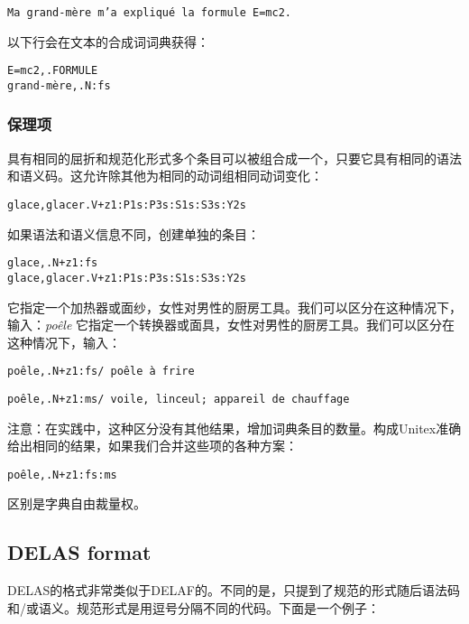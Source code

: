 \verb$Ma grand-mère m’a expliqué la formule E=mc2.$


\bigskip \noindent 以下行会在文本的合成词词典获得：


\begin{verbatim}
E=mc2,.FORMULE
grand-mère,.N:fs
\end{verbatim}


\subsubsection{保理项}

具有相同的屈折和规范化形式多个条目可以被组合成一个，只要它具有相同的语法和语义码。这允许除其他为相同的动词组相同动词变化：


\bigskip
\begin{verbatim}
glace,glacer.V+z1:P1s:P3s:S1s:S3s:Y2s
\end{verbatim}

\bigskip 
\noindent 如果语法和语义信息不同，创建单独的条目：


\bigskip
\begin{verbatim}
glace,.N+z1:fs
glace,glacer.V+z1:P1s:P3s:S1s:S3s:Y2s
\end{verbatim}

\bigskip 
\noindent 它指定一个加热器或面纱，女性对男性的厨房工具。我们可以区分在这种情况下，输入：\textit{poêle} 它指定一个转换器或面具，女性对男性的厨房工具。我们可以区分在这种情况下，输入：


\bigskip
\noindent
\texttt{poêle,.N+z1:fs/ poêle à frire}

\noindent
\texttt{poêle,.N+z1:ms/ voile, linceul; appareil de chauffage}

\bigskip 
\noindent 注意：在实践中，这种区分没有其他结果，增加词典条目的数量。构成Unitex准确给出相同的结果，如果我们合并这些项的各种方案：

\bigskip
\noindent
\texttt{poêle,.N+z1:fs:ms}

\bigskip 
\noindent 区别是字典自由裁量权。



\subsection{DELAS format}
\label{section-DELAS-format}

DELAS的格式非常类似于DELAF的。不同的是，只提到了规范的形式随后语法码和/或语义。规范形式是用逗号分隔不同的代码。下面是一个例子：


